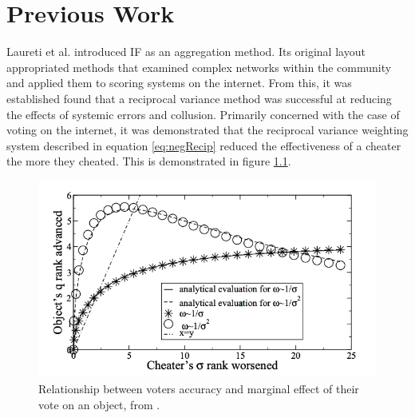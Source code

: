 \chapter{Previous Work}\label{chap:litReview}

Laureti et al. \cite{laureti2006information} introduced IF as an aggregation method. Its original layout appropriated methods that examined complex networks within the community and applied them to scoring systems on the internet. From this, it was established found that a reciprocal variance method was successful at reducing the effects of systemic errors and collusion. Primarily concerned with the case of voting on the internet, it was demonstrated that the reciprocal variance weighting system described in equation \ref{eq:negRecip} reduced the effectiveness of a cheater the more they cheated. This is demonstrated in figure \ref{fig:recipCheating}.

\begin{figure}[H]
    \centering
    \includegraphics{Figures/recipCheating.png}
    \caption[Relationship between voters accuracy and marginal effect of their vote on an object]{Relationship between voters accuracy and marginal effect of their vote on an object, from \textcite{laureti2006information}.}
    \label{fig:recipCheating}
\end{figure}

